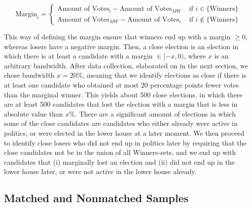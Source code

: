 \documentclass[12pt]{article}
\begin{document}
    \begin{equation}
        \text{Margin}_i = \begin{cases}
            \text{Amount of Votes}_i - \text{Amount of Votes}_{MW} &\mbox{ if } i \in \{ \text{Winners} \} \\
            \text{Amount of Votes}_{MW} - \text{Amount of Votes}_i &\mbox{ if } i \notin \{ \text{Winners} \} 
            \end{cases}
    \end{equation}

This way of defining the margin ensure that winners end up with a margin $\geq 0$, whereas losers have a negative margin. Then, a close election is an election in which there is at least a candidate with a margin $\in [-x, 0)$, where $x$ is an arbitrary bandwidth. After data collection, elaborated on in the next section, we chose bandwidth $x=20\%$, meaning that we identify elections as close if there is at least one candidate who obtained at most 20 percentage points fewer votes than the marginal winner. This yields about 500 close elections, in which there are at least 500 candidates that lost the election with a margin that is less in absolute value than $x\%$. There are a significant amount of elections in which some of the close candidates are candidates who either already were active in politics, or were elected in the lower house at a later moment. We then proceed to identify close losers who did not end up in politics later by requiring that the close candidates not be in the union of all Winners-sets, and we end up with candidates that (i) marginally lost an election and (ii) did not end up in the lower house later, or were not active in the lower house already. 

\subsection{Matched and Nonmatched Samples}
\end{document}
